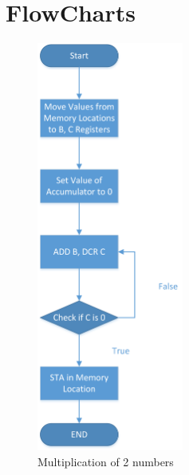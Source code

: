 \documentclass[12pt]{article}
\begin{document}
\section{FlowCharts}
\begin{multicols}{2}
\begin{figure}[H]
\centering
\includegraphics[scale = 0.45,height=13.5cm]{FlowChart.png}
\caption{Multiplication of 2 numbers}
\label{fig:figure1}


\end{figure}
\end{multicols}
\end{document}
